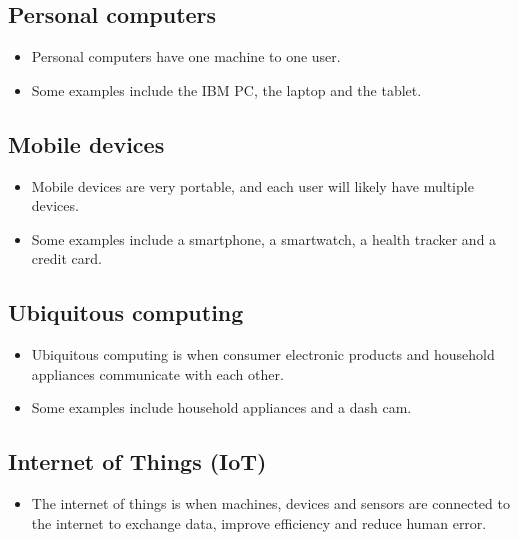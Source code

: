 \documentclass[11pt]{article}
\begin{document}
\subsection{Personal computers}
\label{sec:orgd8f87c9}
\begin{itemize}
\item Personal computers have one machine to one user.
\item Some examples include the IBM PC, the laptop and the tablet.
\end{itemize}

\subsection{Mobile devices}
\label{sec:orgcc2803f}
\begin{itemize}
\item Mobile devices are very portable, and each user will likely have multiple devices.
\item Some examples include a smartphone, a smartwatch, a health tracker and a credit card.
\end{itemize}

\subsection{Ubiquitous computing}
\label{sec:org0f765f9}
\begin{itemize}
\item Ubiquitous computing is when consumer electronic products and household appliances communicate with each other.
\item Some examples include household appliances and a dash cam.
\end{itemize}

\subsection{Internet of Things (IoT)}
\label{sec:org11939da}
\begin{itemize}
\item The internet of things is when machines, devices and sensors are connected to the internet to exchange data, improve efficiency and reduce human error.
\end{itemize}
\end{document}
